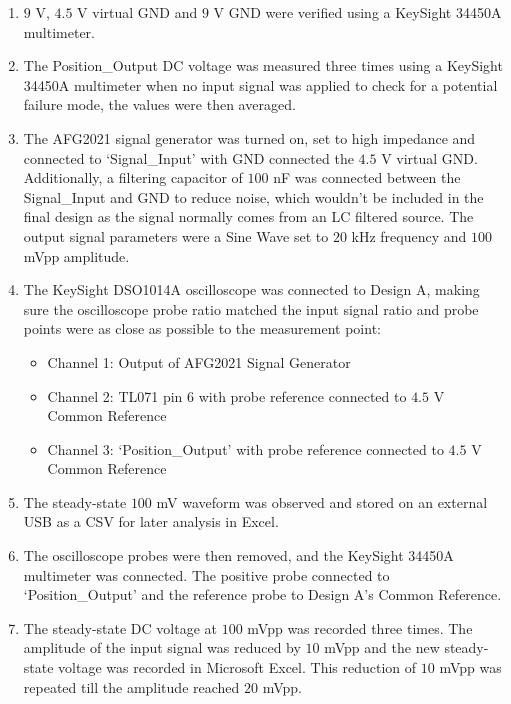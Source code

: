 \begin{enumerate}
    \item \(9\) V, \(4.5\) V virtual GND and \(9\) V GND were verified using a KeySight 34450A multimeter.
    \item The Position\_Output DC voltage was measured three times using a KeySight 34450A multimeter when no input signal was applied to check for a potential failure mode, the values were then averaged. 
    \item The AFG2021 signal generator was turned on, set to high impedance and connected to `Signal\_Input' with GND connected the \(4.5\) V virtual GND. Additionally, a filtering capacitor of \(100\) nF was connected between the Signal\_Input and GND to reduce noise, which wouldn't be included in the final design as the signal normally comes from an LC filtered source. The output signal parameters were a Sine Wave set to \(20\) kHz frequency and \(100\) mVpp amplitude.
    \item{
    The KeySight DSO1014A oscilloscope was connected to Design A, making sure the oscilloscope probe ratio matched the input signal ratio and probe points were as close as possible to the measurement point:
    \begin{itemize}
        \item Channel 1: Output of AFG2021 Signal Generator
        \item Channel 2: TL071 pin 6 with probe reference connected to \(4.5\) V Common Reference
        \item Channel 3: `Position\_Output' with probe reference connected to \(4.5\) V Common Reference
    \end{itemize}
    }
    \item The steady-state \(100\) mV waveform was observed and stored on an external USB as a CSV for later analysis in Excel.

    \item The oscilloscope probes were then removed, and the KeySight 34450A multimeter was connected. The positive probe connected to `Position\_Output' and the reference probe to Design A's Common Reference.

    \item The steady-state DC voltage at \(100\) mVpp was recorded three times. The amplitude of the input signal was reduced by \(10\) mVpp and the new steady-state voltage was recorded in Microsoft Excel. This reduction of \(10\) mVpp was repeated till the amplitude reached \(20\) mVpp.
\end{enumerate}

